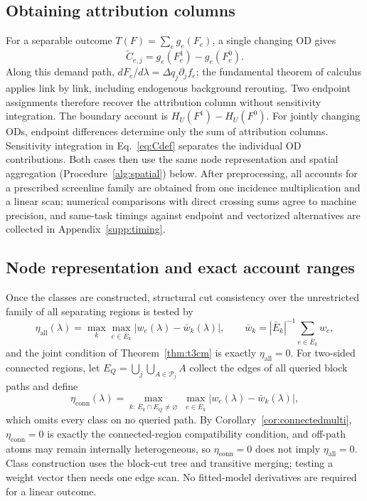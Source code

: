 \documentclass[a4paper,fleqn]{cas-sc}
\begin{document}
\subsection{Obtaining attribution columns}
For a separable outcome $T(F)=\sum_e g_e(F_e)$, a single changing OD gives
\begin{equation}
\widetilde C_{e,j}=g_e(F_e^1)-g_e(F_e^0).
\label{eq:edgeidentity}
\end{equation}
Along this demand path, $dF_e/d\lambda=\Delta q_j\partial_jf_e$; the fundamental theorem of calculus applies link by link, including endogenous background rerouting. Two endpoint assignments therefore recover the attribution column without sensitivity integration. The boundary account is $H_U(F^1)-H_U(F^0)$.
For jointly changing ODs, endpoint differences determine only the sum of attribution columns. Sensitivity integration in Eq.~\eqref{eq:Cdef} separates the individual OD contributions. Both cases then use the same node representation and spatial aggregation (Procedure~\ref{alg:spatial}) below. After preprocessing, all accounts for a prescribed screenline family are obtained from one incidence multiplication and a linear scan; numerical comparisons with direct crossing sums agree to machine precision, and same-task timings against endpoint and vectorized alternatives are collected in Appendix~\ref{supp:timing}.
\subsection{Node representation and exact account ranges}
Once the classes are constructed, structural cut consistency over the
unrestricted family of all separating regions is tested by
\begin{equation}
\eta_{\mathrm{all}}(\lambda)=\max_k\max_{e\in\bar E_k}|w_e(\lambda)-\bar w_k(\lambda)|,
\qquad
\bar w_k=|\bar E_k|^{-1}\sum_{e\in\bar E_k}w_e,
\label{eq:etaall}
\end{equation}
and the joint condition of Theorem~\ref{thm:t3cm} is exactly
$\eta_{\mathrm{all}}=0$. For two-sided connected regions, let
$E_Q=\bigcup_j\bigcup_{A\in\mathcal P_j}A$ collect the edges of all queried
block paths and define
\begin{equation}
\eta_{\mathrm{conn}}(\lambda)=
\max_{k:\,\bar E_k\cap E_Q\neq\varnothing}\;
\max_{e\in\bar E_k}|w_e(\lambda)-\bar w_k(\lambda)|,
\label{eq:etaconn}
\end{equation}
which omits every class on no queried path. By
Corollary~\ref{cor:connectedmulti}, $\eta_{\mathrm{conn}}=0$ is exactly the
connected-region compatibility condition, and off-path atoms may remain
internally heterogeneous, so $\eta_{\mathrm{conn}}=0$ does not imply
$\eta_{\mathrm{all}}=0$. Class construction uses the
block-cut tree and transitive merging; testing a weight vector then needs
one edge scan. No fitted-model derivatives are required for a linear outcome.
\end{document}
